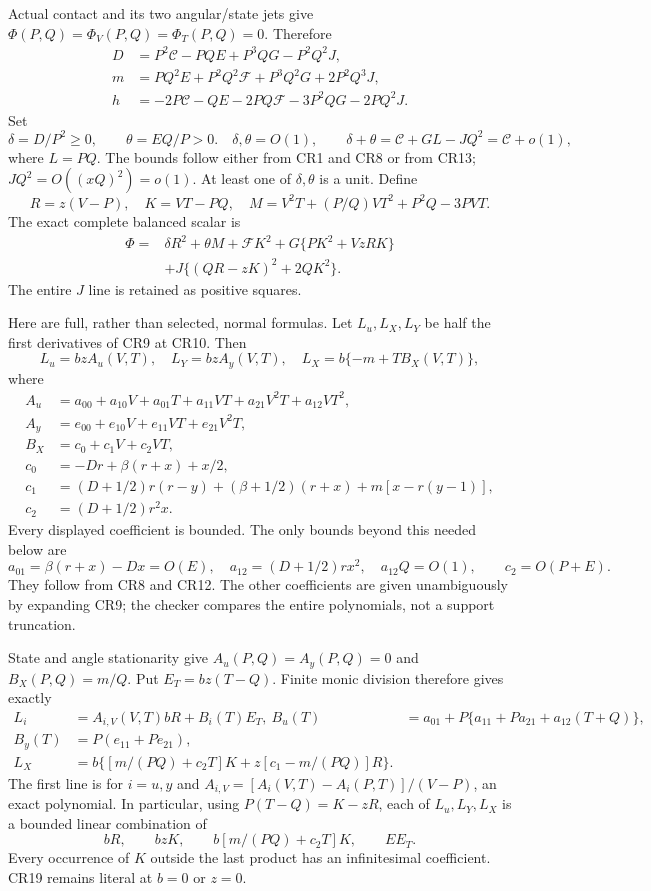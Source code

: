 Actual contact and its two angular/state jets give
$\Phi(P,Q)=\Phi_V(P,Q)=\Phi_T(P,Q)=0$. Therefore
\[
\begin{aligned}
 D&=P^2\mathcal C-PQE+P^3QG-P^2Q^2J,\\
 m&=PQ^2E+P^2Q^2\mathcal F+P^3Q^2G+2P^2Q^3J,\\
 h&=-2P\mathcal C-QE-2PQ\mathcal F-3P^2QG-2PQ^2J.
\end{aligned}\tag{CR13}
\]
Set
\[
 \delta=D/P^2\geq0,\qquad \theta=EQ/P>0.
 \quad \delta,\theta=O(1),\qquad
 \delta+\theta=\mathcal C+GL-JQ^2=\mathcal C+o(1),
 \tag{CR14}
\]
where $L=PQ$. The bounds follow either from CR1 and CR8 or from CR13;
$JQ^2=O((xQ)^2)=o(1)$. At least one of $\delta,\theta$
is a unit. Define
\[
 R=z(V-P),\quad K=VT-PQ,\quad
 M=V^2T+(P/Q)VT^2+P^2Q-3PVT.
\]
The exact complete balanced scalar is
\[
\begin{aligned}
 \Phi={}&\delta R^2+\theta M+\mathcal F K^2
       +G\{PK^2+VzRK\}\\
       &+J\{(QR-zK)^2+2QK^2\}.
\end{aligned}\tag{CR15}
\]
The entire $J$ line is retained as positive squares.

Here are full, rather than selected, normal formulas. Let $L_u,L_X,L_Y$
be half the first derivatives of CR9 at CR10. Then
\[
 L_u=bz A_u(V,T),\quad L_Y=bz A_y(V,T),\quad
 L_X=b\{-m+TB_X(V,T)\},
 \tag{CR16}
\]
where
\[
\begin{aligned}
 A_u&=a_{00}+a_{10}V+a_{01}T+a_{11}VT+a_{21}V^2T+a_{12}VT^2,\\
 A_y&=e_{00}+e_{10}V+e_{11}VT+e_{21}V^2T,\\
 B_X&=c_0+c_1V+c_2VT,\\
 c_0&=-Dr+\beta(r+x)+x/2,\\
 c_1&=(D+1/2)r(r-y)+(\beta+1/2)(r+x)
                        +m[x-r(y-1)],\\
 c_2&=(D+1/2)r^2x.
\end{aligned}\tag{CR17}
\]
Every displayed coefficient is bounded. The only bounds beyond this
needed below are
\[
 a_{01}=\beta(r+x)-Dx=O(E),\quad
 a_{12}=(D+1/2)rx^2,\quad a_{12}Q=O(1),
 \qquad c_2=O(P+E).
 \tag{CR18}
\]
They follow from CR8 and CR12. The other coefficients are given
unambiguously by expanding CR9; the checker compares the entire
polynomials, not a support truncation.

State and angle stationarity give
$A_u(P,Q)=A_y(P,Q)=0$ and $B_X(P,Q)=m/Q$.
Put $E_T=bz(T-Q)$. Finite monic division therefore gives exactly
\[
\begin{aligned}
 L_i&=A_{i,V}(V,T)bR+B_i(T)E_T,\
 B_u(T)&=a_{01}+P\{a_{11}+Pa_{21}+a_{12}(T+Q)\},\\
 B_y(T)&=P(e_{11}+Pe_{21}),\\
 L_X&=b\{[m/(PQ)+c_2T]K+z[c_1-m/(PQ)]R\}.
\end{aligned}\tag{CR19}
\]
The first line is for $i=u,y$ and
$A_{i,V}=[A_i(V,T)-A_i(P,T)]/(V-P)$, an exact polynomial.
In particular, using $P(T-Q)=K-zR$, each of $L_u,L_Y,L_X$
is a bounded linear combination of
\[
 bR,\qquad bzK,\qquad b[m/(PQ)+c_2T]K,
 \qquad E E_T.
 \tag{CR20}
\]
Every occurrence of $K$ outside the last product has an
infinitesimal coefficient. CR19 remains literal at $b=0$ or $z=0$.

